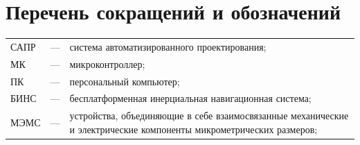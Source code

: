 \chapter*{Перечень сокращений и обозначений}

\begin{table}[h!]
	\centering
	\begin{tabular}{>{\centering\arraybackslash}l l p{13.5cm}}
		САПР 	& --- & система автоматизированного проектирования; \\
		МК 		& --- & микроконтроллер; \\
		ПК 		& --- & персональный компьютер; \\
		БИНС 	& --- & бесплатформенная инерциальная навигационная система; \\
		МЭМС 	& --- & устройства, объединяющие в себе взаимосвязанные механические и электрические компоненты микрометрических размеров; \\
	\end{tabular}
\end{table}